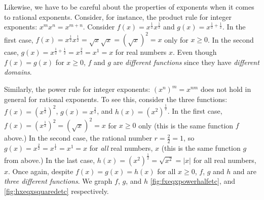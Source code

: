 Likewise, we have to be careful about the properties of exponents when it comes to rational exponents.   Consider, for instance, the product rule for integer exponents:  $x^{m} x^{n} = x^{m+n}$.  Consider $f(x) = x^{\frac{1}{2}} x^{\frac{1}{2}}$ and $g(x) = x^{\frac{1}{2} + \frac{1}{2}}$.  In the first case, $f(x) =  x^{\frac{1}{2}} x^{\frac{1}{2}} =\sqrt{x} \sqrt{x} = (\sqrt{x})^2 = x$ only for $x \geq 0$.   In the second case, $g(x) = x^{\frac{1}{2} + \frac{1}{2}} = x^{\frac{2}{2}} = x^{1} = x$ for  real numbers $x$. Even though $f(x) = g(x)$ for $x \geq 0$, $f$ and $g$ are \textit{different functions} since they have \textit{different domains}.  


Similarly,  the power rule for integer exponents:  $(x^n)^m = x^{nm}$ does not hold  in general for rational exponents. To see this,  consider the three functions: $f(x) = (x^{\frac{1}{2}} )^2$,  $g(x) = x^{\frac{2}{2}}$,  and $h(x) = (x^2)^{\frac{1}{2}}$. In the first case,  $f(x) = (x^{\frac{1}{2}})^2 = (\sqrt{x})^2 = x$ for $x \geq 0$ only (this is the same function $f$ above.)  In the second case,  the rational number $r = \frac{2}{2} = 1$, so $g(x) = x^{\frac{2}{2}} = x^{\frac{1}{1}} = x^{1} = x$ for \textit{all} real numbers, $x$ (this is the same function $g$ from above.)  In the last case,  $h(x) = (x^2)^{\frac{1}{2}} = \sqrt{x^2} = |x|$ for all real numbers, $x$. Once again, despite $f(x) = g(x) = h(x)$ for all $x \geq 0$,  $f$, $g$ and $h$ and are \textit{three different functions}.  We graph $f$, $g$, and $h$ \autoref{fig:fxeqxpowerhalfetc},  and \autoref{fig:hxeqxsquaredetc} respectively.  

